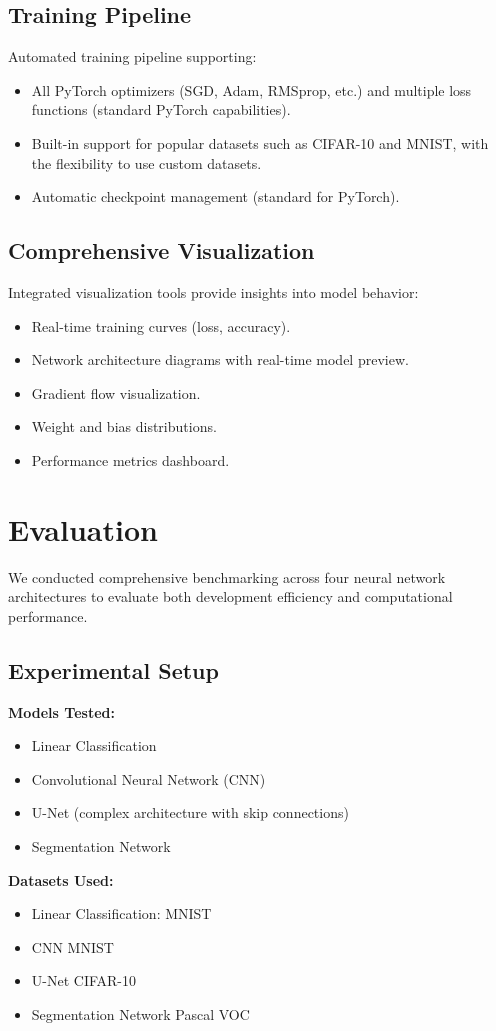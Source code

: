 \documentclass[10pt,conference]{IEEEtran}
\begin{document}
\subsection{Training Pipeline}
Automated training pipeline supporting:
\begin{itemize}
    \item All PyTorch optimizers (SGD, Adam, RMSprop, etc.) and multiple loss functions
          (standard PyTorch capabilities).
    \item Built-in support for popular datasets such as CIFAR-10 and MNIST, with the
          flexibility to use custom datasets.
    \item Automatic checkpoint management (standard for PyTorch).
\end{itemize}

\subsection{Comprehensive Visualization}
Integrated visualization tools provide insights into model behavior:
\begin{itemize}
    \item Real-time training curves (loss, accuracy).
    \item Network architecture diagrams with real-time model preview.
    \item Gradient flow visualization.
    \item Weight and bias distributions.
    \item Performance metrics dashboard. %
\end{itemize}

\section{Evaluation}
We conducted comprehensive benchmarking across four neural network
architectures to evaluate both development efficiency and computational
performance.

\subsection{Experimental Setup}
\textbf{Models Tested:}
\begin{itemize}
    \item Linear Classification
    \item Convolutional Neural Network (CNN)
    \item U-Net (complex architecture with skip connections)
    \item Segmentation Network
\end{itemize}
\textbf{Datasets Used:}
\begin{itemize}
    \item Linear Classification: MNIST~\cite{deng2012mnist}
    \item CNN\: MNIST~\cite{deng2012mnist}
    \item U-Net\: CIFAR-10~\cite{krizhevsky2009cifar}
    \item Segmentation Network\: Pascal VOC~\cite{everingham2010pascal}
\end{itemize}
\end{document}
